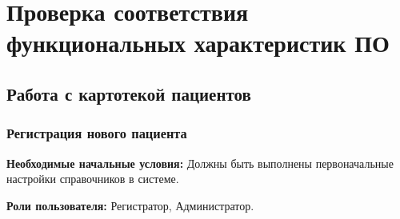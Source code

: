 \newpage
\section{Проверка соответствия функциональных характеристик ПО}
\subsection{Работа с картотекой пациентов}
\subsubsection{Регистрация нового пациента} \label{new_client}

\textbf{Необходимые начальные условия:} Должны быть выполнены первоначальные настройки справочников в системе.

\textbf{Роли пользователя:} Регистратор, Администратор.

